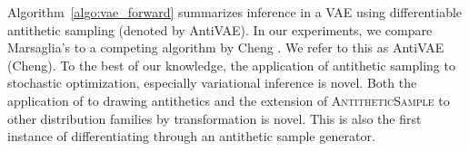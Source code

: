 Algorithm~\ref{algo:vae_forward} summarizes inference in a VAE using differentiable antithetic sampling (denoted by AntiVAE). In our experiments, we compare Marsaglia's to a competing algorithm by Cheng \cite{cheng1982use}. We refer to this as AntiVAE (Cheng).
To the best of our knowledge, the application of antithetic sampling to stochastic optimization, especially variational inference is novel. Both the application of \cite{marsaglia1980c69} to drawing antithetics and the extension of \textsc{AntitheticSample} to other distribution families by transformation is novel. This is also the first instance of differentiating through an antithetic sample generator.
